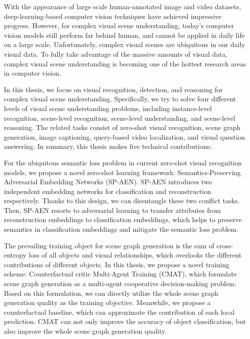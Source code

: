 \begin{englishabstract}

With the appearance of large scale human-annotated image and video datasets, deep-learning-based computer vision techniques have achieved impressive progress. However, for complex visual scene understanding, today's computer vision models still perform far behind human, and cannot be applied in daily life on a large scale. Unfortunately, complex visual scenes are ubiquitous in our daily visual data. To fully take advantage of the massive amounts of visual data, complex visual scene understanding is becoming one of the hottest research areas in computer vision.

In this thesis, we focus on visual recognition, detection, and reasoning for complex visual scene understanding. Specifically, we try to solve four different levels of visual scene understanding problems, including instance-level recognition, scene-level recognition, scene-level understanding, and scene-level reasoning. The related tasks consist of zero-shot visual recognition, scene graph generation, image captioning, query-based video localization, and visual question answering. In summary, this thesis makes five technical contributions:

\begin{asparaenum} 
\item For the ubiquitous semantic loss problem in current zero-shot visual recognition models, we propose a novel zero-shot learning framework: Semantics-Preserving Adversarial Embedding Networks (SP-AEN). SP-AEN introduces two independent embedding networks for classification and reconstruction respectively. Thanks to this design, we can disentangle these two conflict tasks. Then, SP-AEN resorts to adversarial learning to transfer attributes from reconstruction embeddings to classification embeddings, which helps to preserve semantics in classification embeddings and mitigate the semantic loss problem.

\item The prevailing training object for scene graph generation is the sum of cross-entropy loss of all objects and visual relationships, which overlooks the different contributions of different objects. In this thesis, we propose a novel training scheme: Counterfactual critic Multi-Agent Training (CMAT), which formulate scene graph generation as a multi-agent cooperative decision-making problem. Based on this formulation, we can directly utilize the whole scene graph generation quality as the training objective. Meanwhile, we propose a counterfactual baseline, which can approximate the contribution of each local prediction. CMAT can not only improve the accuracy of object classification, but also improve the whole scene graph generation quality.


\end{asparaenum}
\end{englishabstract}

